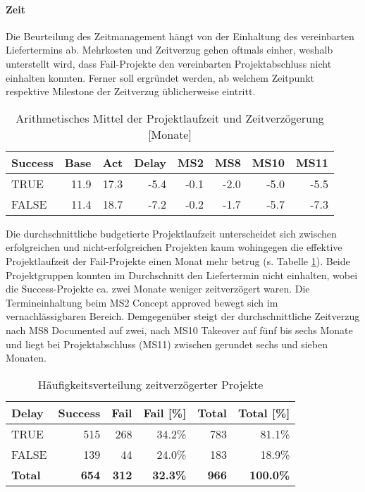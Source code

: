 \paragraph{Zeit} Die Beurteilung des Zeitmanagement hängt von der Einhaltung des vereinbarten Liefertermins ab. Mehrkosten und Zeitverzug gehen oftmals einher, weshalb unterstellt wird, dass Fail-Projekte den vereinbarten Projektabschluss nicht einhalten konnten. Ferner soll ergründet werden, ab welchem Zeitpunkt respektive Milestone der Zeitverzug üblicherweise eintritt.
\begin{table}[H]
	\centering
	\caption{Arithmetisches Mittel der Projektlaufzeit und Zeitverzögerung [Monate]}
	\begin{tabular}{lrrrrrrr}
		\textbf{Success} & \multicolumn{1}{l}{\textbf{Base}} & \multicolumn{1}{l}{\textbf{Act}} & \multicolumn{1}{l}{\textbf{Delay}} & \multicolumn{1}{l}{\textbf{MS2}} & \multicolumn{1}{l}{\textbf{MS8}} & \multicolumn{1}{l}{\textbf{MS10}} & \multicolumn{1}{l}{\textbf{MS11}} \\ \hline
		TRUE  & 11.9  & 17.3  & -5.4  & -0.1  & -2.0  & -5.0  & -5.5 \\
		FALSE & 11.4  & 18.7  & -7.2  & -0.2  & -1.7  & -5.7  & -7.3 \\
	\end{tabular}%
	\label{mtime}%
\end{table}%
Die durchschnittliche budgetierte Projektlaufzeit unterscheidet sich zwischen erfolgreichen und  nicht-erfolgreichen Projekten kaum wohingegen die effektive Projektlaufzeit der Fail-Projekte einen Monat mehr betrug (s. Tabelle \ref{mtime}). Beide Projektgruppen konnten im Durchschnitt den Liefertermin nicht einhalten, wobei die Success-Projekte ca. zwei Monate weniger zeitverzögert waren. Die Termineinhaltung beim MS2 Concept approved bewegt sich im vernachlässigbaren Bereich. Demgegenüber steigt der durchschnittliche Zeitverzug nach MS8 Documented auf zwei, nach MS10 Takeover auf fünf bis sechs Monate und liegt bei Projektabschluss (MS11) zwischen gerundet sechs und sieben Monaten.
\begin{table}[H]
	\centering
	\caption{Häufigkeitsverteilung zeitverzögerter Projekte}
	\begin{tabular}{lrrrrr}
		\textbf{Delay} & \multicolumn{1}{l}{\textbf{Success}} & \multicolumn{1}{l}{\textbf{Fail}} & \multicolumn{1}{l}{\textbf{Fail [\%]}} & \multicolumn{1}{l}{\textbf{Total}} & \multicolumn{1}{l}{\textbf{Total [\%]}} \\ \hline
		TRUE  & 515   & 268   & 34.2\% & 783   & 81.1\% \\
		FALSE & 139   & 44    & 24.0\% & 183   & 18.9\% \\\hline
		\textbf{Total} & \textbf{654} & \textbf{312} & \textbf{32.3\%} & \textbf{966} & \textbf{100.0\%} \\
	\end{tabular}%
	\label{fdelay}%
\end{table}%
